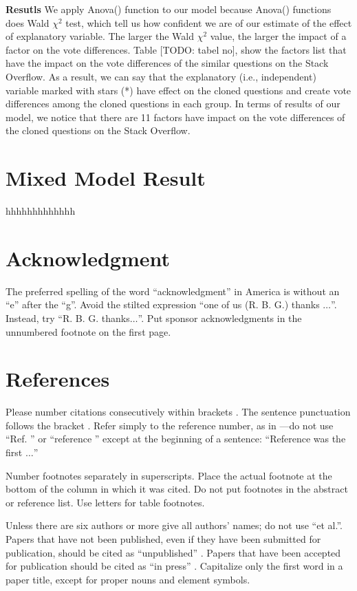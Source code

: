 \documentclass[conference]{IEEEtran}
\begin{document}
\textbf{Resutls}  We apply Anova() function to our model  because Anova() functions does Wald $\chi^2$ test, which tell us how confident we are of our estimate of the effect of explanatory variable. The larger the Wald $\chi^2$ value, the larger the impact of a factor on the vote differences. Table [TODO: tabel no], show the factors list that have the impact on the vote differences of the similar questions on the Stack Overflow. As a result, we can say that the explanatory (i.e., independent) variable marked with stars (*) have effect on the cloned questions and create vote differences among the cloned questions in each group. In terms of results of our model, we notice that there are 11 factors have impact on the vote differences of the cloned questions on the Stack Overflow.




 

\section{Mixed Model Result}
	hhhhhhhhhhhhh
	\section*{Acknowledgment}
	
	The preferred spelling of the word ``acknowledgment'' in America is without 
	an ``e'' after the ``g''. Avoid the stilted expression ``one of us (R. B. 
	G.) thanks $\ldots$''. Instead, try ``R. B. G. thanks$\ldots$''. Put sponsor 
	acknowledgments in the unnumbered footnote on the first page.
	
	\section*{References}
	
	Please number citations consecutively within brackets \cite{b1}. The 
	sentence punctuation follows the bracket \cite{b2}. Refer simply to the reference 
	number, as in \cite{b3}---do not use ``Ref. \cite{b3}'' or ``reference \cite{b3}'' except at 
	the beginning of a sentence: ``Reference \cite{b3} was the first $\ldots$''
	
	Number footnotes separately in superscripts. Place the actual footnote at 
	the bottom of the column in which it was cited. Do not put footnotes in the 
	abstract or reference list. Use letters for table footnotes.
	
	Unless there are six authors or more give all authors' names; do not use 
	``et al.''. Papers that have not been published, even if they have been 
	submitted for publication, should be cited as ``unpublished'' \cite{b4}. Papers 
	that have been accepted for publication should be cited as ``in press'' \cite{b5}. 
	Capitalize only the first word in a paper title, except for proper nouns and 
	element symbols.
	
\end{document}
